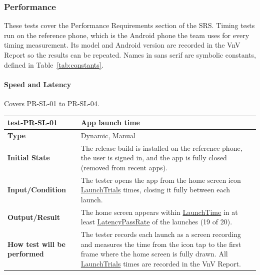 \documentclass[12pt, titlepage]{article}
\newcommand{\const}[1]{\hyperlink{const:#1}{\textsf{#1}}}
\begin{document}
\subsubsection{Performance}\label{sec:tests_nfr_perf}

These tests cover the Performance Requirements section of the SRS. Timing
tests run on the reference phone, which is the Android phone the team uses
for every timing measurement. Its model and Android version are recorded in
the VnV Report so the results can be repeated. Names in \textsf{sans serif}
are symbolic constants, defined in Table~\ref{tab:constants}.

\paragraph{Speed and Latency}

Covers PR-SL-01 to PR-SL-04.

\noindent\begin{tabularx}{\textwidth}{>{\raggedright\arraybackslash}p{3.5cm}X}
  \toprule
  \textbf{test-PR-SL-01} & \textbf{App launch time}\\
  \midrule
  \textbf{Type} & Dynamic, Manual\\
  \textbf{Initial State} & The release build is installed on the reference phone, the user is signed in, and the app is fully closed (removed from recent apps).\\
  \textbf{Input/Condition} & The tester opens the app from the home screen icon \const{LaunchTrials} times, closing it fully between each launch.\\
  \textbf{Output/Result} & The home screen appears within \const{LaunchTime} in at least \const{LatencyPassRate} of the launches (19 of 20).\\
  \textbf{How test will be performed} & The tester records each launch as a screen recording and measures the time from the icon tap to the first frame where the home screen is fully drawn. All \const{LaunchTrials} times are recorded in the VnV Report.\\
  \bottomrule
\end{tabularx}

\vspace{1em}
\end{document}
